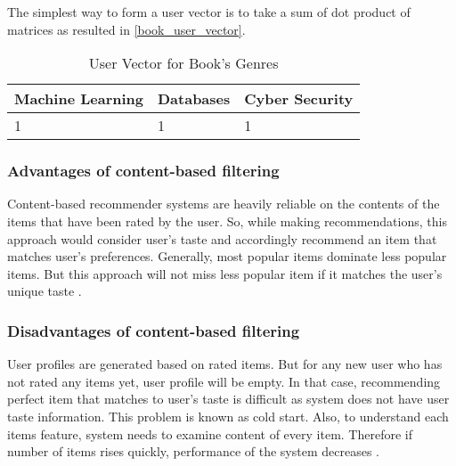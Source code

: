 The simplest way to form a user vector is to take a sum of dot product of matrices as resulted in \autoref{book_user_vector}.  
\begin{table}[]
\begin{tabular}{|l|l|l|}
\hline
Machine Learning & Databases & Cyber Security \\ \hline
1                & 1         & 1              \\ \hline
\end{tabular}
\caption{User Vector for Book's Genres}
\label{book_user_vector}
\end{table}


\subsubsection{Advantages of content-based filtering}

Content-based recommender systems are heavily reliable on the contents of the items that have been rated by the user. So, while making recommendations, this approach would consider user’s taste and accordingly recommend an item that matches user’s preferences. Generally, most popular items dominate less popular items. But this approach will not miss less popular item if it matches the user’s unique taste \cite{6}.
\\
\subsubsection{Disadvantages of content-based filtering}

User profiles are generated based on rated items. But for any new user who has not rated any items yet, user profile will be empty. In that case, recommending perfect item that matches to user’s taste is difficult as system does not have user taste information. This problem is known as cold start. Also, to understand each items feature, system needs to examine content of every item. Therefore if number of items rises quickly, performance of the system decreases \cite{6}.  
\\

